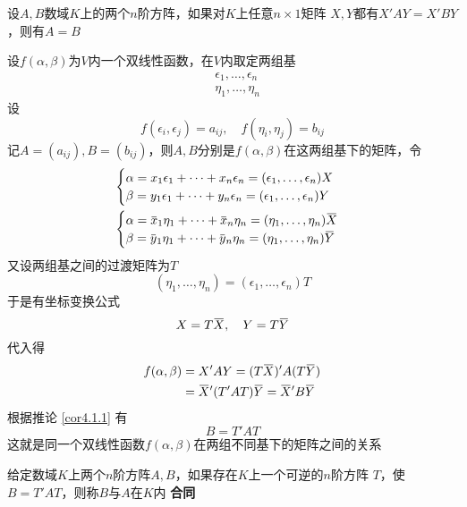 \documentclass[11pt]{article}
\begin{document}
\begin{corollary}[]
\label{cor4.1.1}
设\(A,B\)数域\(K\)上的两个\(n\)阶方阵，如果对\(K\)上任意\(n\times 1\)矩阵
\(X,Y\)都有\(X'AY=X'BY\)，则有\(A=B\)
\end{corollary}


设\(f(\alpha,\beta)\)为\(V\)内一个双线性函数，在\(V\)内取定两组基
\begin{align*}
&\epsilon_1,\dots,\epsilon_n\\
&\eta_1,\dots,\eta_n
\end{align*}
设
\begin{equation*}
f(\epsilon_i,\epsilon_j)=a_{ij},\quad f(\eta_i,\eta_j)=b_{ij}
\end{equation*}
记\(A=(a_{ij}),B=(b_{ij})\)，则\(A,B\)分别是\(f(\alpha,\beta)\)在这两组基下的矩阵，令
\begin{align*}
&
\begin{cases}
\alpha=x_1\epsilon_1+\dots+x_n\epsilon_n=(\epsilon_1,\dots,\epsilon_n)X\\
\beta=y_1\epsilon_1+\dots+y_n\epsilon_n=(\epsilon_1,\dots,\epsilon_n)Y
\end{cases}\\
&
\begin{cases}
\alpha=\bbar{x}_1\eta_1+\dots+\bbar{x}_n\eta_n=(\eta_1,\dots,\eta_n)\bbar{X}\\
\beta=\bbar{y}_1\eta_1+\dots+\bbar{y}_n\eta_n=(\eta_1,\dots,\eta_n)\bbar{Y}\\
\end{cases}
\end{align*}
又设两组基之间的过渡矩阵为\(T\)
\begin{equation*}
(\eta_1,\dots,\eta_n)=(\epsilon_1,\dots,\epsilon_n)T
\end{equation*}
于是有坐标变换公式
\begin{equation*}
X=T\bbar{X},\quad Y=T\bbar{Y}
\end{equation*}
代入得
\begin{align*}
f(\alpha,\beta)&=X'AY=(T\bbar{X})'A(T\bbar{Y})\\
&=\bbar{X}'(T'AT)\bbar{Y}=\bbar{X}'B\bbar{Y}
\end{align*}
根据推论 \ref{cor4.1.1} 有
\begin{equation*}
B=T'AT
\end{equation*}
这就是同一个双线性函数\(f(\alpha,\beta)\)在两组不同基下的矩阵之间的关系

\begin{definition}[]
给定数域\(K\)上两个\(n\)阶方阵\(A,B\)，如果存在\(K\)上一个可逆的\(n\)阶方阵
\(T\)，使\(B=T'AT\)，则称\(B\)与\(A\)在\(K\)内 \textbf{合同}
\end{definition}
\end{document}
